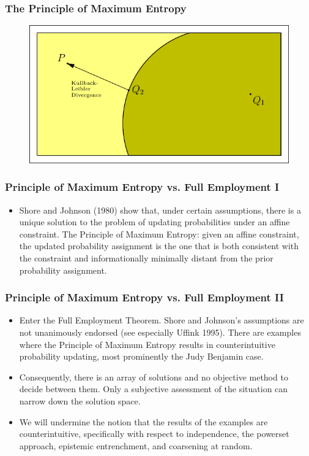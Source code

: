 \documentclass[xcolor=dvipsnames]{beamer}
\begin{document}
\begin{frame}
  \frametitle{The Principle of Maximum Entropy}
\begin{figure}[h]
\includegraphics[scale=1.1]{../diagrams/constraint-d.pdf}
\end{figure}
\end{frame}

\begin{frame}
  \frametitle{Principle of Maximum Entropy vs. Full Employment I}
\begin{itemize}
\item Shore and Johnson (1980) show that, under certain
  assumptions, there is a unique solution to the problem of
  updating probabilities under an affine constraint. The Principle
  of Maximum Entropy: given an affine constraint, the updated
  probability assignment is the one that is both consistent with
  the constraint and informationally minimally distant from the
  prior probability assignment.
\end{itemize}
\end{frame}

\begin{frame}
  \frametitle{Principle of Maximum Entropy vs. Full Employment II}
\begin{itemize}
\item Enter the Full Employment Theorem. Shore and Johnson's
  assumptions are not unanimously endorsed (see especially Uffink
  1995). There are examples where the Principle of Maximum Entropy
  results in counterintuitive probability updating, most
  prominently the Judy Benjamin case.
\item Consequently, there is an array of solutions and no
  objective method to decide between them. Only a subjective
  assessment of the situation can narrow down the solution space.
\item We will undermine the notion that the results of the
  examples are counterintuitive, specifically with respect to
  independence, the powerset approach, epistemic entrenchment, and
  coarsening at random.
\end{itemize}
\end{frame}
\end{document}
